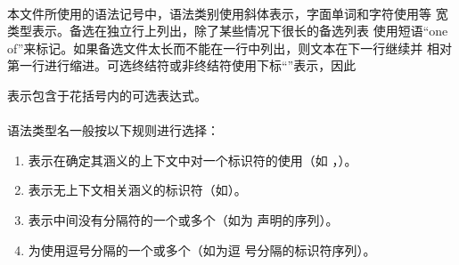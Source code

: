 \paragraph{} %
本文件所使用的语法记号中，语法类别使用斜体表示，字面单词和字符使用等
宽类型表示。备选在独立行上列出，除了某些情况下很长的备选列表
使用短语“one of”来标记。如果备选文件太长而不能在一行中列出，则文本在下一行继续并
相对第一行进行缩进。可选终结符或非终结符使用下标“”表示，因此
\par\hspace{-2em}
表示包含于花括号内的可选表达式。

\paragraph{} %
语法类型名一般按以下规则进行选择：
\begin{enumerate}
  \item {}表示在确定其涵义的上下文中对一个标识符的使用（如
        ，）。
  \item {}表示无上下文相关涵义的标识符（如）。
  \item {}表示中间没有分隔符的一个或多个（如为
        声明的序列）。
  \item {}为使用逗号分隔的一个或多个（如为逗
        号分隔的标识符序列）。
\end{enumerate}

